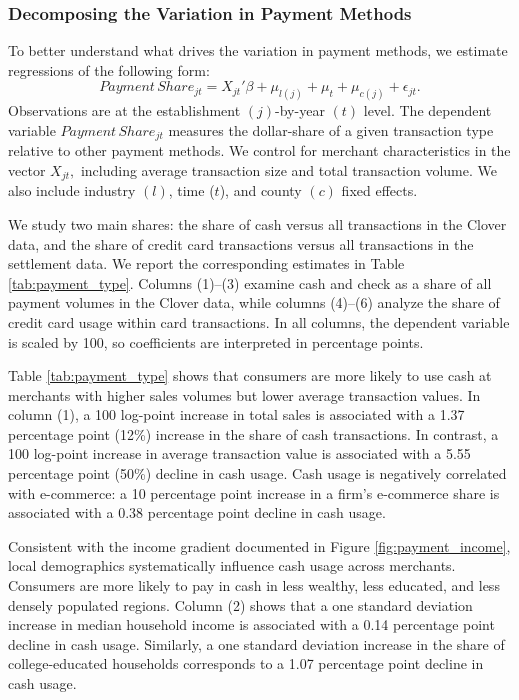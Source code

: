 \documentclass[11pt,english]{article}
\theoremstyle{remark}
\begin{document}
\subsubsection{Decomposing the Variation in Payment Methods}
To better understand what drives the variation in payment methods, we estimate regressions of the following form:
\begin{equation}
Payment\,Share_{jt}=X_{jt}'\beta+\mu_{l(j)}+\mu_t+\mu_{c(j)}+\epsilon_{jt}.

\end{equation}
Observations are at the establishment $(j)$-by-year $(t)$ level.
The dependent variable $Payment\,Share_{jt}$ measures the dollar-share of a given transaction type relative to other payment methods.
We control for merchant characteristics in the vector $X_{jt},$ including average transaction size and total transaction volume.
We also include industry $(l)$, time ($t$), and county $(c)$ fixed effects.

We study two main shares: the share of cash versus all transactions in the Clover data, and the share of credit card transactions versus all transactions in the settlement data. 
We report the corresponding estimates in Table \ref{tab:payment_type}.
Columns (1)--(3) examine cash and check as a share of all payment volumes in the Clover data, while columns (4)--(6) analyze the share of credit card usage within card transactions.
In all columns, the dependent variable is scaled by 100, so coefficients are interpreted in percentage points.

Table \ref{tab:payment_type} shows that consumers are more likely to use cash at merchants with higher sales volumes but lower average transaction values.
In column (1), a 100 log-point increase in total sales is associated with a 1.37 percentage point (12\%) increase in the share of cash transactions.
In contrast, a 100 log-point increase in average transaction value is associated with a 5.55 percentage point (50\%) decline in cash usage.
Cash usage is negatively correlated with e-commerce: a 10 percentage point increase in a firm's e-commerce share is associated with a 0.38 percentage point decline in cash usage.

Consistent with the income gradient documented in Figure \ref{fig:payment_income}, local demographics systematically influence cash usage across merchants. Consumers are more likely to pay in cash in less wealthy, less educated, and less densely populated regions.
Column (2) shows that a one standard deviation increase in median household income is associated with a 0.14 percentage point decline in cash usage.
Similarly, a one standard deviation increase in the share of college-educated households corresponds to a 1.07 percentage point decline in cash usage.
\end{document}
